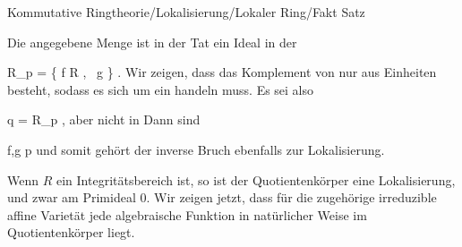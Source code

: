 {Kommutative Ringtheorie/Lokalisierung/Lokaler Ring/Fakt}
{Satz}
{}
{



\faktsituation {}
\faktzusatz {}
\faktzusatz {}





}
{





Die angegebene Menge ist in der Tat ein Ideal in der

\mavergleichskettedisp
{\vergleichskette
{ R_{\mathfrak p}
}
{ =} { \left\{   \mid  f \in R , \,  g \not{}       \right\}
}
{ } {
}
{ } {
}
{ } {
}
}
{}{}{.}
Wir zeigen, dass das Komplement von
  nur aus Einheiten besteht, sodass es sich um ein
handeln muss. Es sei also

\mavergleichskette
{\vergleichskette
{q
}
{ = }{ {  }
}
{ \in }{ R_{\mathfrak p}
}
{    }{
}
{   }{
}
}
{}{}{,}
aber nicht in
 Dann sind

\mavergleichskette
{\vergleichskette
{f,g
}
{ \notin }{ {\mathfrak p}
}
{  }{
}
{    }{
}
{   }{
}
}
{}{}{}
und somit gehört der inverse Bruch
 ebenfalls zur Lokalisierung.




}







Wenn $R$ ein Integritätsbereich ist, so ist der Quotientenkörper eine Lokalisierung, und zwar am Primideal $0$. Wir zeigen jetzt, dass für die zugehörige irreduzible affine Varietät
 jede algebraische Funktion in natürlicher Weise im Quotientenkörper liegt.



